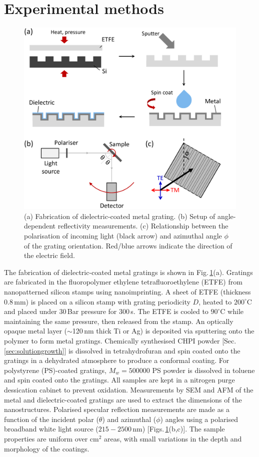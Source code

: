 \section{Experimental methods}
\begin{figure}[h!] 
\centering    
\includegraphics[width=\textwidth]{Fig1}
\caption[(a) Fabrication and (b,c) setup of optical measurements on dielectric-coated metal gratings.]{(a) Fabrication of dielectric-coated metal grating. (b) Setup of angle-dependent reflectivity measurements. (c) Relationship between the polarisation of incoming light (black arrow) and azimuthal angle $\phi$ of the grating orientation. Red/blue arrows indicate the direction of the electric field.}
\label{7Fig1}
\end{figure}
The fabrication of dielectric-coated metal gratings is shown in Fig.\,\ref{7Fig1}(a). Gratings are fabricated in the fluoropolymer ethylene tetrafluoroethylene (ETFE) from nanopatterned silicon stamps using nanoimprinting. A sheet of ETFE (thickness 0.8\,mm) is placed on a silicon stamp with grating periodicity $D$, heated to $200^{\circ}$C and placed under 30\,Bar pressure for 300\,s. The ETFE is cooled to $90^{\circ}$C while maintaining the same pressure, then released from the stamp. An optically opaque metal layer ($\sim$120\,nm thick Ti or Ag) is deposited via sputtering onto the polymer to form metal gratings. Chemically synthesised CHPI powder [Sec.\,\ref{sec:solutiongrowth}] is dissolved in tetrahydrofuran and spin coated onto the gratings in a dehydrated atmosphere to produce a conformal coating. For polystyrene (PS)-coated gratings, $M_w=500000$ PS powder is dissolved in toluene and spin coated onto the gratings. All samples are kept in a nitrogen purge dessication cabinet to prevent oxidation. Measurements by SEM and AFM of the metal and dielectric-coated gratings are used to extract the dimensions of the nanostructures. Polarised specular reflection measurements are made as a function of the incident polar ($\theta$) and azimuthal ($\phi$) angles using a polarised broadband white light source ($215-2500$\,nm) [Figs.\,\ref{7Fig1}(b,c)]. The sample properties are uniform over cm$^2$ areas, with small variations in the depth and morphology of the coatings.

